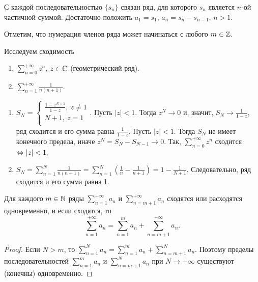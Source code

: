 \begin{note}
    С каждой последовательностью $\{s_{n}\}$ связан ряд, для которого $s_{n}$ является $n$-ой частичной суммой. Достаточно положить $a_1 = s_1$, $a_n = s_{n} - s_{n - 1}$, $n > 1$.
\end{note}

Отметим, что нумерация членов ряда может начинаться с любого $m \in \mathbb{Z}$.

\begin{example}
    Исследуем сходимость
    \begin{enumerate}
        \item $\sum_{n = 0}^{+\infty} z^{n}$, $z \in \mathbb{C}$ (геометрический ряд). 
        \item $\sum_{n = 1}^{+\infty} \frac{1}{n(n+1)}$.
    \end{enumerate}
\end{example}

\begin{solution}
    \begin{enumerate}
        \item $S_{N}$ = $\begin{cases}
        \frac{1 - z^{N+1}}{1 - z}, \ z \neq 1 \\
        N+1, \ z = 1 \\
    \end{cases}$. Пусть $|z| < 1$. Тогда $z^{N} \to 0$ и, значит, $S_N \to \frac{1}{1 - z}$, ряд сходится и его сумма равна $\frac{1}{1 - z}$. Пусть $|z| < 1$. Тогда $S_{N}$ не имеет конечного предела, иначе $z^{N} = S_{N} - S_{N-1} \to 0$. Так, $\sum_{n = 0}^{+\infty} z^{n}$ сходится $\Leftrightarrow |z| < 1$. 
        \item $S_{N} = \sum_{n = 1}^{N} \frac{1}{n(n+1)} = \sum_{n = 1}^{N}\left(\frac{1}{n} - \frac{1}{n + 1}\right) = 1 - \frac{1}{N+1}$. Следовательно, ряд сходится и его сумма равна 1.
    \end{enumerate}
\end{solution}

\begin{lemma}
    Для каждого $m \in \mathbb{N}$ ряды $\sum_{n = 1}^{+\infty}a_{n}$ и $\sum_{n = m + 1}^{+\infty}a_{n}$ сходятся или расходятся одновременно, и если сходятся, то
    \[\sum_{n = 1}^{+\infty}a_{n} = \sum_{n = 1}^{m}a_{n} + \sum_{n = m + 1}^{+\infty}a_{n}.\]
\end{lemma}

\begin{proof}
    Если $N > m$, то $\sum_{n = 1}^{N}a_{n} = \sum_{n = 1}^{m}a_{n} + \sum_{n = m + 1}^{N}a_{n}$. Поэтому пределы последовательностей $\sum_{n = 1}^{m}a_{n}$ и $\sum_{n = m + 1}^{N}a_{n}$ при $N \to +\infty$ существуют (конечны) одновременно.
\end{proof}

